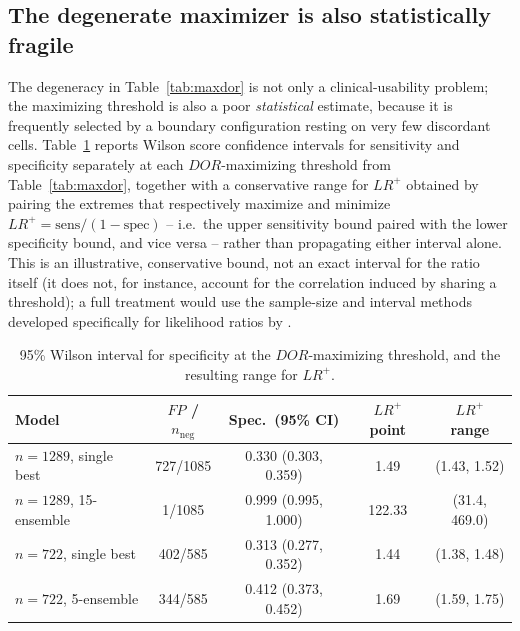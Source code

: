 \documentclass[11pt]{article}
\begin{document}
\subsection{The degenerate maximizer is also statistically fragile}
\label{sec:fragility}

The degeneracy in Table~\ref{tab:maxdor} is not only a clinical-usability
problem; the maximizing threshold is also a poor \emph{statistical}
estimate, because it is frequently selected by a boundary configuration
resting on very few discordant cells. Table~\ref{tab:fragility} reports
Wilson score confidence intervals \citep{newcombe1998} for sensitivity and
specificity separately at each $DOR$-maximizing threshold from
Table~\ref{tab:maxdor}, together with a conservative range for $LR^+$
obtained by pairing the extremes that respectively maximize and minimize
$LR^+ = \mathrm{sens}/(1-\mathrm{spec})$ -- i.e.\ the upper sensitivity
bound paired with the lower specificity bound, and vice versa -- rather
than propagating either interval alone. This is an illustrative,
conservative bound, not an exact interval for the ratio itself (it does
not, for instance, account for the correlation induced by sharing a
threshold); a full treatment would use the sample-size and interval
methods developed specifically for likelihood ratios by \citet{simel1991}.

\begin{table}[ht]
\centering
\caption{95\% Wilson interval for specificity at the $DOR$-maximizing
threshold, and the resulting range for $LR^+$.}
\label{tab:fragility}
\begin{tabular}{lcccc}
\toprule
Model & $FP$ / $n_{\mathrm{neg}}$ & Spec.\ (95\% CI) & $LR^+$ point & $LR^+$ range \\
\midrule
$n{=}1289$, single best   & 727/1085 & 0.330 (0.303, 0.359) & 1.49   & (1.43, 1.52) \\
$n{=}1289$, 15-ensemble   & 1/1085   & 0.999 (0.995, 1.000) & 122.33 & (31.4, 469.0) \\
$n{=}722$, single best    & 402/585  & 0.313 (0.277, 0.352) & 1.44   & (1.38, 1.48) \\
$n{=}722$, 5-ensemble     & 344/585  & 0.412 (0.373, 0.452) & 1.69   & (1.59, 1.75) \\
\bottomrule
\end{tabular}
\end{table}
\end{document}
